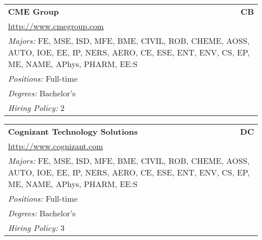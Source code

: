 \documentclass[twoside]{article}
\begin{document}
\begin{center}
\begin{multicols}{3}
\begin{FlushLeft}
\begin{minipage}{.9\columnwidth}\begin{tabularx}{.95\columnwidth}{Xr}
                 {\Large\bf CME Group} & {\Large\bf CB}\\
    \multicolumn{2}{p{.95\columnwidth}}{\url{http://www.cmegroup.com}}\\
    \multicolumn{2}{p{.95\columnwidth}}{\emph{Majors:} FE, MSE, ISD, MFE, BME, CIVIL, ROB, CHEME, AOSS, AUTO, IOE, EE, IP, NERS, AERO, CE, ESE, ENT, ENV, CS, EP, ME, NAME, APhys, PHARM, EE:S}\\
    \multicolumn{2}{p{.95\columnwidth}}{\emph{Positions:} Full-time}\\
    \multicolumn{2}{p{.95\columnwidth}}{\emph{Degrees:} Bachelor's}\\
    \multicolumn{2}{p{.95\columnwidth}}{\emph{Hiring Policy:} 2}\\
    \end{tabularx}
    
\end{minipage}
 
\begin{minipage}{.9\columnwidth}\begin{tabularx}{.95\columnwidth}{Xr}
                 {\Large\bf Cognizant Technology Solutions} & {\Large\bf DC}\\
    \multicolumn{2}{p{.95\columnwidth}}{\url{http://www.cognizant.com}}\\
    \multicolumn{2}{p{.95\columnwidth}}{\emph{Majors:} FE, MSE, ISD, MFE, BME, CIVIL, ROB, CHEME, AOSS, AUTO, IOE, EE, IP, NERS, AERO, CE, ESE, ENT, ENV, CS, EP, ME, NAME, APhys, PHARM, EE:S}\\
    \multicolumn{2}{p{.95\columnwidth}}{\emph{Positions:} Full-time}\\
    \multicolumn{2}{p{.95\columnwidth}}{\emph{Degrees:} Bachelor's}\\
    \multicolumn{2}{p{.95\columnwidth}}{\emph{Hiring Policy:} 3}\\
    \end{tabularx}
    
\end{minipage}
 

\end{FlushLeft}
\end{multicols}
\end{center}
\end{document}
